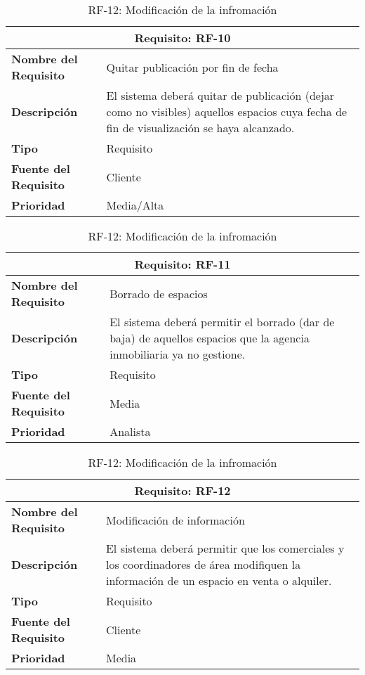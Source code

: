\begin{table}[H]
\begin{table}[H]
\begin{center}
\begin{tabular}{p{} p{7cm}}
\multicolumn{2}{c}{\textbf{Requisito: RF-10} } \\
\hline \hline
\textbf{Nombre del Requisito} &  Quitar publicación por fin de fecha \\
\hline
\textbf{Descripción} & El sistema deberá quitar de publicación (dejar como no visibles) aquellos espacios cuya fecha de fin de visualización se haya alcanzado.\\
\hline
\textbf{Tipo} & Requisito  \\
\hline
\textbf{Fuente del Requisito} & Cliente  \\
\hline
\textbf{Prioridad} &  Media/Alta \\ \hline
\end{tabular}
\caption{RF-10: Quitar publicación por fin de fecha}
\label{tab:RF-10}
\end{center}
\end{table}

\begin{table}[H]
\begin{center}
\begin{tabular}{p{} p{7cm}}
\multicolumn{2}{c}{\textbf{Requisito: RF-11} } \\
\hline \hline
\textbf{Nombre del Requisito} &  Borrado de espacios \\
\hline
\textbf{Descripción} & El sistema deberá permitir el borrado (dar de baja) de aquellos espacios que la agencia inmobiliaria ya no gestione.\\
\hline
\textbf{Tipo} & Requisito  \\
\hline
\textbf{Fuente del Requisito} & Media  \\
\hline
\textbf{Prioridad} &  Analista \\ \hline
\end{tabular}
\caption{RF-11: Borrado de espacios}
\label{tab:RF-11}
\end{center}
\end{table}

\begin{table}[H]
\begin{center}
\begin{tabular}{p{} p{7cm}}
\multicolumn{2}{c}{\textbf{Requisito: RF-12} } \\
\hline \hline
\textbf{Nombre del Requisito} &  Modificación de información \\
\hline
\textbf{Descripción} & El sistema deberá permitir que los comerciales y los coordinadores de área modifiquen la información de un espacio en venta o alquiler. \\
\hline
\textbf{Tipo} & Requisito  \\
\hline
\textbf{Fuente del Requisito} &  Cliente \\
\hline
\textbf{Prioridad} &  Media \\ \hline
\end{tabular}
\caption{RF-12: Modificación de la infromación}
\label{tab:RF-12}
\end{center}
\end{table}


\end{table}
